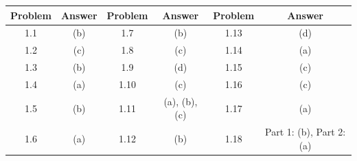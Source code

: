 \begin{center}
\renewcommand{\arraystretch}{1.3}
\begin{tabular}{|c|c||c|c||c|c|}
\hline
\textbf{Problem} & \textbf{Answer} & \textbf{Problem} & \textbf{Answer} & \textbf{Problem} & \textbf{Answer} \\
\hline
1.1 & (b) & 1.7 & (b) & 1.13 & (d) \\
1.2 & (c) & 1.8 & (c) & 1.14 & (a) \\
1.3 & (b) & 1.9 & (d) & 1.15 & (c) \\
1.4 & (a) & 1.10 & (c) & 1.16 & (c) \\
1.5 & (b) & 1.11 & (a), (b), (c) & 1.17 & (a) \\
1.6 & (a) & 1.12 & (b) & 1.18 & Part 1: (b), Part 2: (a) \\
\hline
\end{tabular}
\end{center}
\fi
